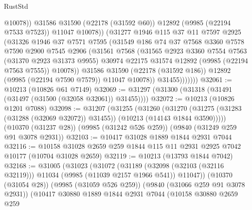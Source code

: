 \begin{lexlean}{RustStd}
\begin{coremodule}
                        @10078))
                    @31586
                    @31590
                    (@22178 (@31592 @60))
                    @12892
                    (@9985 (@22194 @7533 @7523))
                    @11047
                    @10078))
                (@31277
                  @1946
                  @115
                  @37
                  @11
                  @7597
                  @2925
                  (@31326
                    @1946
                    @37
                    @7571
                    @7595
                    (@31549
                      @186
                      @74
                      @37
                      @7568
                      @3360
                      @7578
                      @7590
                      @2900
                      @7545
                      @2906
                      (@31561
                        @7568
                        (@31565
                          @2923
                          @3360
                          @7554
                          @7563
                          (@31370 @2923 @31373 @9955)
                          @30974
                          @22175
                          @31574
                          @12892
                          (@9985 (@22194 @7563 @7555))
                          @10078))
                      @31586
                      @31590
                      (@22178 (@31592 @186))
                      @12892
                      (@9985 (@22194 @7590 @7579))
                      @11047
                      @10078))
                  @31455)))))))
@32061 := @10213 (@10826 @61 @7149)
@32069 := @31297 (@31300 (@31318 (@31491 (@31497 (@31500 (@32058 @32061)) @31455))))
@32072 := @10213 (@10826 @1201 @7088)
@32098 := @31207
    (@31255
      (@31260
        (@31270 (@31275 (@31283 (@31288 (@32069 @32072)) @31455)) (@10213 (@14143 @1844 @3590)))))
    (@10370 (@31237 @28))
    (@9985 (@31242 @526 @259))
    (@9840 (@31249 @259 @91 @3078 @2931))
@32103 := @10417 @31028 @1889 @1844 @2931 @7044
@32116 := @10158 @31028 @2659 @259 @1844 @115 @11 @2931 @2925 @7042 @10177 (@10704 @31028 @2659)
@32119 := @10213 (@13793 @1844 @7042)
@32168 := @31005
    (@31023
      (@31072
        (@31189 (@32098 (@32103 (@32116 @32119))) @11034 (@9985 (@11039 @2157 @1966 @541)) @11047))
      (@10370 (@31054 @28))
      (@9985 (@31059 @526 @259))
      (@9840 (@31066 @259 @91 @3078 @2931))
      (@10417
        @30880
        @1889
        @1844
        @2931
        @7044
        (@10158
          @30880
          @2659
          @259

\end{coremodule}
\end{lexlean}
